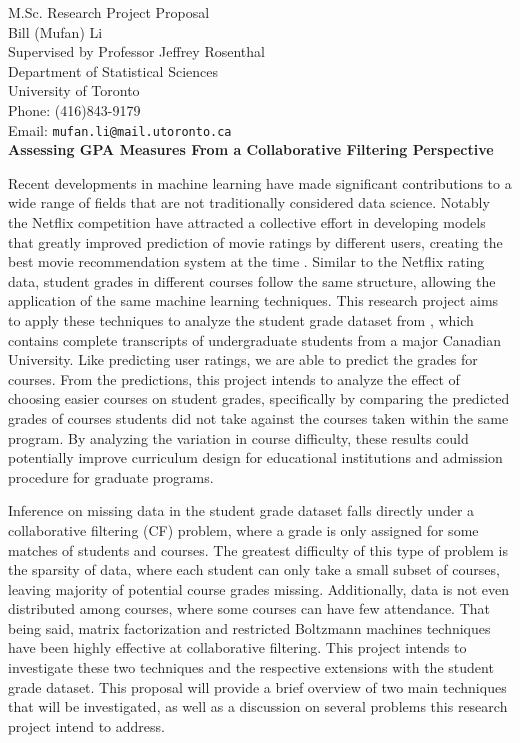 \documentclass[12pt]{article}
\begin{document}
\begin{center}
M.Sc. Research Project Proposal \\
Bill (Mufan) Li \\
Supervised by Professor Jeffrey Rosenthal \\
Department of Statistical Sciences \\
University of Toronto \\
Phone: (416)843-9179\\
Email: {\tt mufan.li@mail.utoronto.ca}\\
\bigskip\Large
{\bf Assessing GPA Measures From a Collaborative Filtering
Perspective}
\end{center}

Recent developments in machine learning have made significant 
contributions to a wide range of fields that are not 
traditionally considered data science.
Notably the Netflix competition have attracted a collective
effort in developing models that greatly improved prediction
of movie ratings by different users,
creating the best movie recommendation system at the time \cite{FeHeKh12}.
Similar to the Netflix rating data,
student grades in different courses follow the same structure,
allowing the application of the same machine learning techniques.
This research project aims to apply these
techniques to analyze the student grade dataset from \cite{BaRoYo14},
which contains complete transcripts of undergraduate students
from a major Canadian University.
Like predicting user ratings,
we are able to predict the grades for courses.
From the predictions, this project intends to analyze
the effect of choosing easier courses on student grades,
specifically by comparing the predicted grades of courses
students did not take against the courses taken 
within the same program.
By analyzing the variation in course difficulty,
these results could potentially improve curriculum design 
for educational institutions and admission procedure for
graduate programs.

Inference on missing data in the
student grade dataset falls directly under a collaborative
filtering (CF) problem, where a grade is only assigned for
some matches of students and courses.
The greatest difficulty of this type of problem is the sparsity
of data, where each student can only take a small subset of 
courses, leaving majority of potential course grades missing.
Additionally, data is not even distributed among courses, 
where some courses can have few attendance.
That being said, matrix factorization and restricted Boltzmann
machines techniques have been highly effective at collaborative filtering.
This project intends to investigate these two techniques and
the respective extensions with the student grade dataset.
This proposal will provide a brief overview of 
two main techniques that will be investigated,
as well as a discussion on several problems
this research project intend to address.
\end{document}
